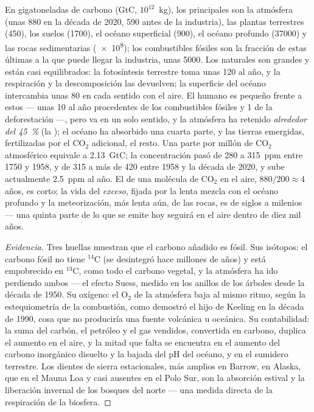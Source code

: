 \begin{proposition}\label{prop:b2:biogeochemical-cycles:carbon}
En gigatoneladas de carbono (\unit{GtC}, $10^{12}$~kg), los principales
 son la atmósfera (unas 880 en la década de 2020, 590 antes de
la industria), las plantas terrestres (450), los suelos (1700), el océano
superficial (900), el océano profundo (\num{37000}) y las rocas
sedimentarias (\num{e8}); los combustibles fósiles son la fracción de estas
últimas a la que puede llegar la industria, unas \num{5000}. Los 
naturales son grandes y están casi equilibrados: la fotosíntesis terrestre
toma unas 120 al año, y la respiración y la descomposición las devuelven;
la superficie del océano intercambia unas 80 en cada sentido con el aire.
El  humano es pequeño frente a estos --- unas 10 al año procedentes
de los combustibles fósiles y 1 de la deforestación ---, pero va en un solo
sentido, y la atmósfera ha retenido
\emph{alrededor del \qty{45}{\%}} (la \emph{});
el océano ha absorbido una cuarta parte, y las tierras emergidas,
fertilizadas por el
$\mathrm{CO_2}$ adicional, el resto. Una parte por millón de $\mathrm{CO_2}$ atmosférico equivale a
\qty{2.13}{GtC}; la concentración pasó de 280 a \num{315}~ppm
entre 1750 y 1958, y de 315 a más de \num{420} entre 1958
y la década de 2020, y sube actualmente \qty{2.5}{ppm} al año. El  de una molécula de $\mathrm{CO_2}$ en el aire, $880/200 \approx 4$ años,
es corto; la vida del \emph{exceso}, fijada por la lenta mezcla con el
océano profundo y la meteorización, más lenta aún, de las rocas, es de
siglos a milenios --- una quinta parte de lo que se emite hoy seguirá en
el aire dentro de diez mil años.
\end{proposition}
\begin{proof}[Evidencia]
Tres huellas muestran que el carbono añadido es fósil. Sus isótopos: el
carbono fósil no tiene $\mathrm{{}^{14}C}$ (se desintegró hace millones de
años) y está empobrecido en $\mathrm{{}^{13}C}$, como todo el carbono vegetal,
y la atmósfera ha ido perdiendo ambos --- el efecto Suess, medido en los
anillos de los árboles desde la década de 1950. Su oxígeno: el
$\mathrm{O_2}$ de la atmósfera baja al mismo ritmo, según la estequiometría
de la combustión, como demostró el hijo de Keeling en la década de 1990,
cosa que no produciría una fuente volcánica u oceánica. Su contabilidad:
la suma del carbón, el petróleo y el gas vendidos, convertida en carbono,
duplica el aumento en el aire, y la mitad que falta se encuentra en el
aumento del carbono inorgánico disuelto y la bajada del pH del océano, y
en el sumidero terrestre. Los dientes de sierra estacionales, más amplios
en Barrow, en Alaska, que en el Mauna Loa y casi ausentes en el Polo Sur,
son la absorción estival y la liberación invernal de los bosques del norte
--- una medida directa de la respiración de la biosfera.
\end{proof}
